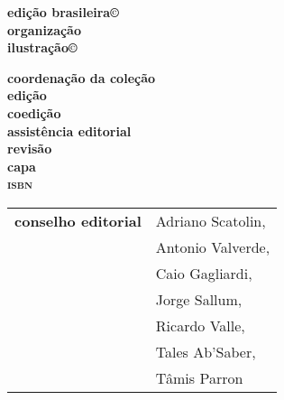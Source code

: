 \newcommand{\linha}[2]{\ifdef{#2}{\linhalayout{#1}{#2}}{}}

\begingroup\tiny
\parindent=0cm
\thispagestyle{empty}

\textbf{edição brasileira©}\\
\textbf{organização}\\
\textbf{ilustração©}\medskip


\textbf{coordenação da coleção}\\
\textbf{edição}\\
\textbf{coedição}\\
\textbf{assistência editorial}\\
\textbf{revisão}\\				
\textbf{capa}\\

\textbf{\textsc{isbn}}

\hspace{-5pt}\begin{tabular}{ll}
\textbf{conselho editorial} & Adriano Scatolin,  \\
							& Antonio Valverde,  \\
							& Caio Gagliardi,    \\
							& Jorge Sallum,      \\
							& Ricardo Valle,     \\
							& Tales Ab'Saber,    \\
							& Tâmis Parron      
\end{tabular}
 
